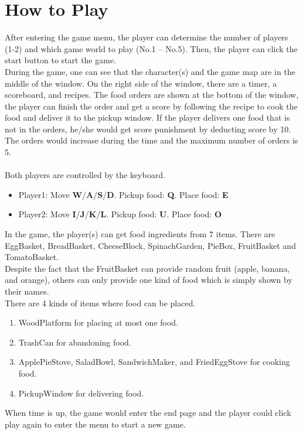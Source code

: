 \section{How to Play}

After entering the game menu, the player can determine the number of players (1-2) and which game world to play (No.1 – No.5). Then, the player can click the start button to start the game.\\
During the game, one can see that the character(s) and the game map are in the middle of the window. On the right side of the window, there are a timer, a scoreboard, and recipes. The food orders are shown at the bottom of the window, the player can finish the order and get a score by following the recipe to cook the food and deliver it to the pickup window. If the player delivers one food that is not in the orders, he/she would get score punishment by deducting score by 10. The orders would increase during the time and the maximum number of orders is 5.\\
\\
Both players are controlled by the keyboard.\\
\begin{itemize}
    \item Player1: Move \textbf{W}/\textbf{A}/\textbf{S}/\textbf{D}. Pickup food: \textbf{Q}. Place food: \textbf{E}\\
    \item Player2: Move \textbf{I}/\textbf{J}/\textbf{K}/\textbf{L}. Pickup food: \textbf{U}. Place food: \textbf{O}\\
\end{itemize}


In the game, the player(s) can get food ingredients from 7 items. There are EggBasket, BreadBasket, CheeseBlock, SpinachGarden, PieBox, FruitBasket and TomatoBasket.\\
Despite the fact that the FruitBasket can provide random fruit (apple, banana, and orange), others can only provide one kind of food which is simply shown by their names.\\
There are 4 kinds of items where food can be placed.\\
\begin{enumerate}
	\item WoodPlatform for placing at most one food.
    \item TrashCan for abandoning food.
    \item ApplePieStove, SaladBowl, SandwichMaker, and FriedEggStove for cooking food.
    \item PickupWindow for delivering food.
\end{enumerate}
When time is up, the game would enter the end page and the player could click play again to enter the menu to start a new game.
